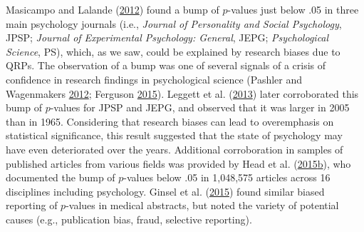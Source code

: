 \documentclass[a5paper]{book}
\begin{document}
Masicampo and Lalande
(\protect\hyperlink{ref-doi:10.1080ux2f17470218.2012.711335}{2012})
found a bump of \(p\)-values just below .05 in three main psychology
journals (i.e., \emph{Journal of Personality and Social Psychology},
JPSP; \emph{Journal of Experimental Psychology: General}, JEPG;
\emph{Psychological Science}, PS), which, as we saw, could be explained
by research biases due to QRPs. The observation of a bump was one of
several signals of a crisis of confidence in research findings in
psychological science (Pashler and Wagenmakers
\protect\hyperlink{ref-doi:10.1177ux2f1745691612465253}{2012}; Ferguson
\protect\hyperlink{ref-doi:10.1037ux2fa0039405}{2015}). Leggett et al.
(\protect\hyperlink{ref-doi:10.1080ux2f17470218.2013.863371}{2013})
later corroborated this bump of \(p\)-values for JPSP and JEPG, and
observed that it was larger in 2005 than in 1965. Considering that
research biases can lead to overemphasis on statistical significance,
this result suggested that the state of psychology may have even
deteriorated over the years. Additional corroboration in samples of
published articles from various fields was provided by Head et al.
(\protect\hyperlink{ref-doi:10.1371ux2fjournal.pbio.1002106}{2015}\protect\hyperlink{ref-doi:10.1371ux2fjournal.pbio.1002106}{b}),
who documented the bump of \(p\)-values below .05 in 1,048,575 articles
across 16 disciplines including psychology. Ginsel et al.
(\protect\hyperlink{ref-doi:10.1186ux2fs13104-015-1691-x}{2015}) found
similar biased reporting of \(p\)-values in medical abstracts, but noted
the variety of potential causes (e.g., publication bias, fraud,
selective reporting).
\end{document}
